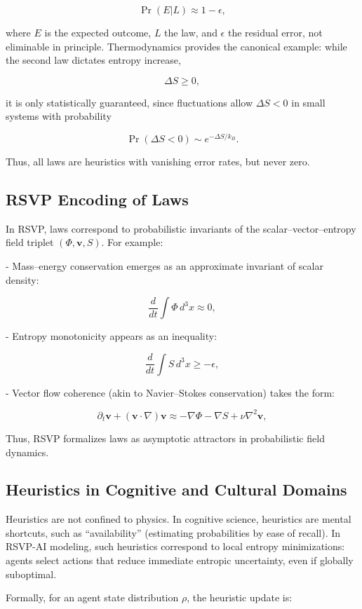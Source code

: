 \documentclass[12pt]{book}
\begin{document}
\[ \Pr(E | L) \approx 1 - \epsilon, \]

where \( E \) is the expected outcome, \( L \) the law, and \( \epsilon \) the residual error, not eliminable in principle. Thermodynamics provides the canonical example: while the second law dictates entropy increase,

\[ \Delta S \geq 0, \]

it is only statistically guaranteed, since fluctuations allow \( \Delta S < 0 \) in small systems with probability

\[ \Pr(\Delta S < 0) \sim e^{-\Delta S / k_B}. \]

Thus, all laws are heuristics with vanishing error rates, but never zero.

\subsection{RSVP Encoding of Laws}
In RSVP, laws correspond to probabilistic invariants of the scalar–vector–entropy field triplet \( (\Phi, \mathbf{v}, S) \). For example:

- Mass–energy conservation emerges as an approximate invariant of scalar density:

\[ \frac{d}{dt} \int \Phi \, d^3x \approx 0, \]

- Entropy monotonicity appears as an inequality:

\[ \frac{d}{dt} \int S \, d^3x \geq -\epsilon, \]

- Vector flow coherence (akin to Navier–Stokes conservation) takes the form:

\[ \partial_t \mathbf{v} + (\mathbf{v}\cdot \nabla)\mathbf{v} \approx -\nabla \Phi - \nabla S + \nu \nabla^2 \mathbf{v}, \]

Thus, RSVP formalizes laws as asymptotic attractors in probabilistic field dynamics.

\subsection{Heuristics in Cognitive and Cultural Domains}
Heuristics are not confined to physics. In cognitive science, heuristics are mental shortcuts, such as “availability” (estimating probabilities by ease of recall). In RSVP-AI modeling, such heuristics correspond to local entropy minimizations: agents select actions that reduce immediate entropic uncertainty, even if globally suboptimal.

Formally, for an agent state distribution \( \rho \), the heuristic update is:
\end{document}
